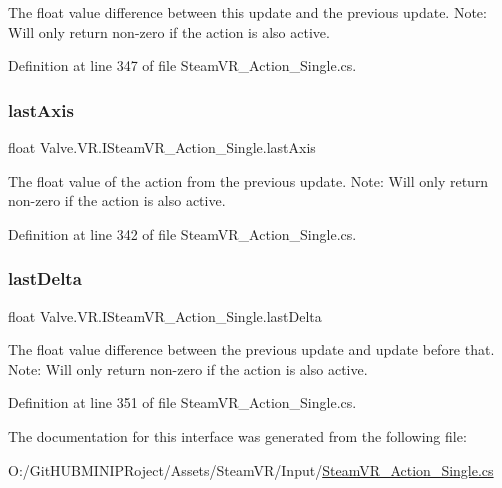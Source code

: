 The float value difference between this update and the previous update. Note\+: Will only return non-\/zero if the action is also active. 



Definition at line 347 of file Steam\+V\+R\+\_\+\+Action\+\_\+\+Single.\+cs.

\mbox{\label{interface_valve_1_1_v_r_1_1_i_steam_v_r___action___single_a6217b8a72e297e41c529f870b72cd674}} 
\subsubsection{\texorpdfstring{lastAxis}{lastAxis}}
{\footnotesize\ttfamily float Valve.\+V\+R.\+I\+Steam\+V\+R\+\_\+\+Action\+\_\+\+Single.\+last\+Axis\hspace{0.3cm}{\ttfamily [get]}}



The float value of the action from the previous update. Note\+: Will only return non-\/zero if the action is also active. 



Definition at line 342 of file Steam\+V\+R\+\_\+\+Action\+\_\+\+Single.\+cs.

\mbox{\label{interface_valve_1_1_v_r_1_1_i_steam_v_r___action___single_a8589001fdb512d0be19ab4f6bbbadc95}} 
\subsubsection{\texorpdfstring{lastDelta}{lastDelta}}
{\footnotesize\ttfamily float Valve.\+V\+R.\+I\+Steam\+V\+R\+\_\+\+Action\+\_\+\+Single.\+last\+Delta\hspace{0.3cm}{\ttfamily [get]}}



The float value difference between the previous update and update before that. Note\+: Will only return non-\/zero if the action is also active. 



Definition at line 351 of file Steam\+V\+R\+\_\+\+Action\+\_\+\+Single.\+cs.



The documentation for this interface was generated from the following file\+:\begin{DoxyCompactItemize}
\item 
O\+:/\+Git\+H\+U\+B\+M\+I\+N\+I\+P\+Roject/\+Assets/\+Steam\+V\+R/\+Input/\mbox{\hyperlink{_steam_v_r___action___single_8cs}{Steam\+V\+R\+\_\+\+Action\+\_\+\+Single.\+cs}}\end{DoxyCompactItemize}
